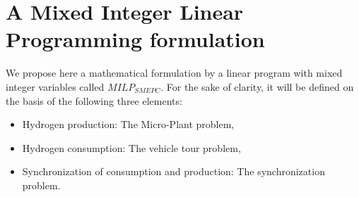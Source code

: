 \documentclass[11pt]{article}
\theoremstyle{plain}%
\theoremstyle{definition} \newtheorem{lem}{Lemma}[section]
\theoremstyle{definition} \newtheorem{claim}{Claim}[lem]
\theoremstyle{definition} \newtheorem{theorem}{Theorem}[section]
\theoremstyle{definition} \newtheorem{exo}{Exercice n$^\circ$}
\theoremstyle{definition} \newtheorem{quest}{}[exo]
\theoremstyle{definition} \newtheorem{sousquest}{}[quest]
\theoremstyle{remark}
\theoremstyle{definition}
\begin{document}
\section{A Mixed Integer Linear Programming formulation }\label{sec3}
We propose here a mathematical formulation by a linear program with mixed integer variables called $MILP_{SMEPC}$. For the sake of clarity, it will be defined on the basis of the following three elements:
\begin{itemize}
\item Hydrogen production: The Micro-Plant problem,
\item Hydrogen consumption: The vehicle tour problem,
\item Synchronization of consumption and production: The synchronization problem.
\end{itemize}
\end{document}

